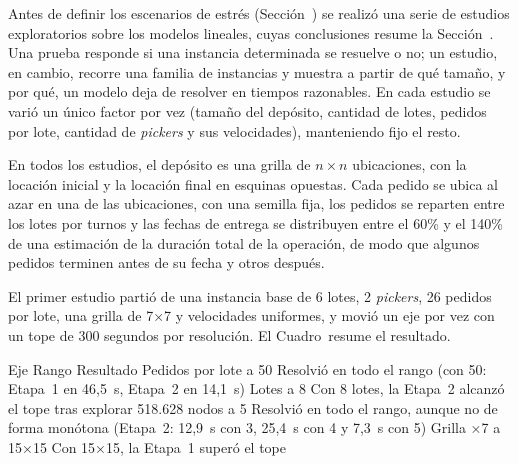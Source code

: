 \startchapter[title={Relevamiento de los modelos lineales}, reference=Anexo_Relevamiento]

Antes de definir los escenarios de estrés (Sección~) se
realizó una serie de estudios exploratorios sobre los modelos lineales, cuyas
conclusiones resume la Sección~. Una prueba responde si una instancia
determinada se resuelve o no; un estudio, en cambio, recorre una familia de
instancias y muestra a partir de qué tamaño, y por qué, un modelo deja de
resolver en tiempos razonables. En cada estudio se varió un único factor
por vez (tamaño del depósito, cantidad de lotes, pedidos por lote, cantidad
de {\em pickers} y sus velocidades), manteniendo fijo el resto.

En todos los estudios, el depósito es una grilla de $n \times n$ ubicaciones,
con la locación inicial y la locación final en esquinas opuestas. Cada pedido se
ubica al azar en una de las ubicaciones, con una semilla fija, los pedidos se
reparten entre los lotes por turnos y las fechas de entrega se distribuyen
entre el 60\% y el 140\% de una estimación de la duración total de la
operación, de modo que algunos pedidos terminen antes de su fecha y otros
después.

\startsection[title={Qué dimensión limita al modelo Split}]

El primer estudio partió de una instancia base de 6 lotes, 2 {\em pickers},
26 pedidos por lote, una grilla de 7×7 y velocidades uniformes, y movió un
eje por vez con un tope de 300 segundos por resolución. El
Cuadro~ resume el resultado.

\startplacetable[reference=tab:relev_ejes, location=here, title={Eje que se movió en cada barrido y resultado del modelo Split, con un tope de 300 segundos por resolución.}]
	\bTABLE[split=yes, align=middle, frame=on, width=fit]
	\setupTABLE[row][1][background=color, backgroundcolor=darkgray, style=bold]
	\setupTABLE[column][3][width=7.5cm, align=flushleft]
	\bTR \bTH Eje \eTH \bTH Rango \eTH \bTH Resultado \eTH \eTR
	\bTR \bTD Pedidos por lote \eTD {} a 50 \eTD \bTD Resolvió en todo el rango (con 50: Etapa~1 en 46,5~s, Etapa~2 en 14,1~s) \eTD \eTR
	\bTR \bTD Lotes \eTD {} a 8 \eTD \bTD Con 8 lotes, la Etapa~2 alcanzó el tope tras explorar 518.628 nodos \eTD \eTR
	\bTR {} \eTD {} a 5 \eTD \bTD Resolvió en todo el rango, aunque no de forma monótona (Etapa~2: 12,9~s con 3, 25,4~s con 4 y 7,3~s con 5) \eTD \eTR
	\bTR \bTD Grilla \eTD {}×7 a 15×15 \eTD \bTD Con 15×15, la Etapa~1 superó el tope \eTD \eTR
	\eTABLE
\stopplacetable


